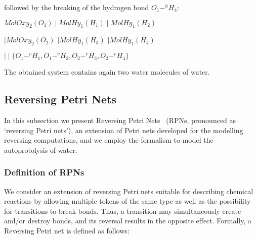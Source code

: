 \documentclass[runningheads]{llncs}
\newcommand{\MolOxy}{\mathit{MolOxy}}
\newcommand{\MolHy}{\mathit{MolHy}}
\begin{document}
\noindent 
followed by the breaking of the hydrogen bond $O_1-^h H_4$:

\begin{center}$\MolOxy_2(O_1) \mid \MolHy_1(H_1) \mid \MolHy_1(H_2) $\end{center}

\begin{center}$\mid \MolOxy_2(O_2)$ $ \mid \MolHy_1(H_3)$ $ \mid \MolHy_{1}(H_4)$\end{center}

\begin{center}$\mid\mid \{O_1 -^c H_1, O_1 -^c H_2, O_2 -^c H_3, O_2 -^c H_4\}$\end{center}

\noindent 
The obtained system contains again two water molecules of water.

\subsection{Reversing Petri Nets}
In this subsection we present Reversing Petri Nets~\cite{RPNs} (RPNs, pronounced as `reversing Petri nets'), an extension of Petri nets
developed for the modelling reversing computations, and we employ the formalism
to model the autoprotolysis of water. 

\subsubsection{Definition of RPNs}

We consider
an extension of reversing Petri nets suitable for describing chemical reactions by allowing multiple tokens of the same type as well as the possibility for 
transitions to break bonds. Thus, a transition may simultaneously create
and/or destroy bonds, and its reversal results in the opposite effect. Formally, a Reversing Petri net
is defined as follows:
\end{document}
